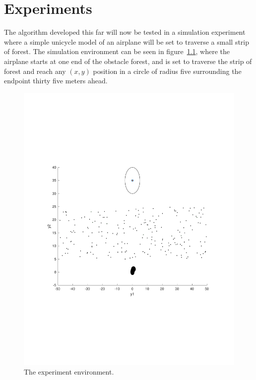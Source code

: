 \chapter{Experiments}
\label{chp:experiments}

The \rrtfunnel{} algorithm developed this far will now be tested in a simulation
experiment where a simple unicycle model of an airplane will be set to traverse
a small strip of forest. The simulation environment can be seen in
figure~\cref{fig:simulated-forest}, where the airplane starts at one end of the
obstacle forest, and is set to traverse the strip of forest and reach any
\((x,y)\) position in a circle of radius five surrounding the endpoint thirty
five meters ahead.

\begin{figure}
  \centering \includegraphics[scale=.5]{figures/experiments/simulated-forest}
  \caption{The experiment environment.}
  \label{fig:simulated-forest}
\end{figure}

